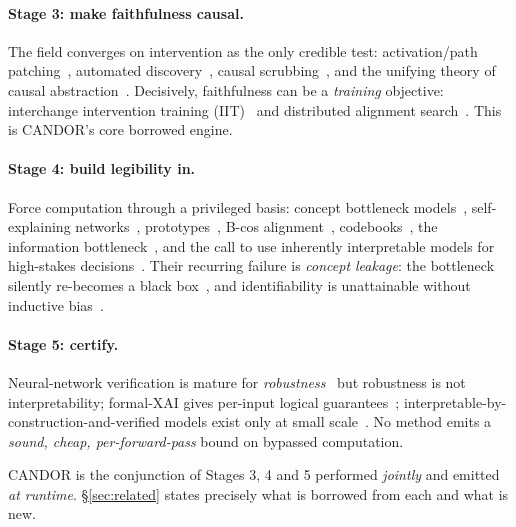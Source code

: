 \documentclass[11pt]{article}
\begin{document}
\paragraph{Stage 3: make faithfulness causal.} The field converges on intervention
as the only credible test: activation/path patching~\citep{goldowskydill2023pathpatching,
zhang2024bestpractices}, automated discovery~\citep{conmy2023acdc,syed2023eap},
causal scrubbing~\citep{chan2022causalscrubbing}, and the unifying theory of causal
abstraction~\citep{geiger2021causalabstractions,geiger2025causalabstraction}.
Decisively, faithfulness can be a \emph{training} objective: interchange intervention
training (IIT)~\citep{geiger2022iit} and distributed alignment
search~\citep{geiger2024das,wu2023boundlessdas}. This is CANDOR's core borrowed engine.

\paragraph{Stage 4: build legibility in.} Force computation through a privileged
basis: concept bottleneck models~\citep{koh2020concept,espinosa2022concept},
self-explaining networks~\citep{alvarezmelis2018senn}, prototypes~\citep{chen2019thislooks},
B-cos alignment~\citep{bohle2022bcos}, codebooks~\citep{oord2017vqvae}, the
information bottleneck~\citep{tishby2015deep}, and the call to use inherently
interpretable models for high-stakes decisions~\citep{rudin2019stop}. Their recurring
failure is \emph{concept leakage}: the bottleneck silently re-becomes a black
box~\citep{mahinpei2021promises,havasi2022addressing}, and identifiability is
unattainable without inductive bias~\citep{locatello2019challenging}.

\paragraph{Stage 5: certify.} Neural-network verification is mature for
\emph{robustness}~\citep{katz2017reluplex,zhang2018crown,wang2021betacrown,xu2020autolirpa}
but robustness is not interpretability; formal-XAI gives per-input logical
guarantees~\citep{ignatiev2019abduction}; interpretable-by-construction-and-verified
models exist only at small scale~\citep{przybysz2023verifying,granmo2018tsetlin,lin2020gosdt}.
No method emits a \emph{sound, cheap, per-forward-pass} bound on bypassed computation.

\medskip
\noindent CANDOR is the conjunction of Stages 3, 4 and 5 performed \emph{jointly} and
emitted \emph{at runtime}. \S\ref{sec:related} states precisely what is borrowed from
each and what is new.
\end{document}
